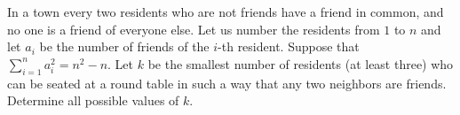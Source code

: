 \documentclass{article}
\begin{document}
\setlength{\parindent}{0pt}
In a town every two residents who are not friends have a friend in common, and no one is a friend of everyone else. Let us number the residents from $1$ to $n$ and let $a_{i}$ be the number of friends of the $i$-th resident. Suppose that $\sum_{i=1}^{n}a_{i}^{2}=n^{2}-n$. Let $k$ be the smallest number of residents (at least three) who can be seated at a round table in such a way that any two neighbors are friends. Determine all possible values of $k$.
\end{document}
